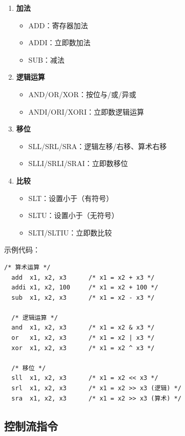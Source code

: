 \begin{enumerate}
  \item \textbf{加法}
    \begin{itemize}
      \item ADD：寄存器加法
      \item ADDI：立即数加法
      \item SUB：减法
    \end{itemize}

  \item \textbf{逻辑运算}
    \begin{itemize}
      \item AND/OR/XOR：按位与/或/异或
      \item ANDI/ORI/XORI：立即数逻辑运算
    \end{itemize}

  \item \textbf{移位}
    \begin{itemize}
      \item SLL/SRL/SRA：逻辑左移/右移、算术右移
      \item SLLI/SRLI/SRAI：立即数移位
    \end{itemize}

  \item \textbf{比较}
    \begin{itemize}
      \item SLT：设置小于（有符号）
      \item SLTU：设置小于（无符号）
      \item SLTI/SLTIU：立即数比较
    \end{itemize}
\end{enumerate}

示例代码：
\begin{lstlisting}[language={[RISC-V]Assembler}]
  /* 算术运算 */
  add  x1, x2, x3      /* x1 = x2 + x3 */
  addi x1, x2, 100     /* x1 = x2 + 100 */
  sub  x1, x2, x3      /* x1 = x2 - x3 */

  /* 逻辑运算 */
  and  x1, x2, x3      /* x1 = x2 & x3 */
  or   x1, x2, x3      /* x1 = x2 | x3 */
  xor  x1, x2, x3      /* x1 = x2 ^ x3 */

  /* 移位 */
  sll  x1, x2, x3      /* x1 = x2 << x3 */
  srl  x1, x2, x3      /* x1 = x2 >> x3 (逻辑) */
  sra  x1, x2, x3      /* x1 = x2 >> x3 (算术) */
\end{lstlisting}

\subsection{控制流指令}

